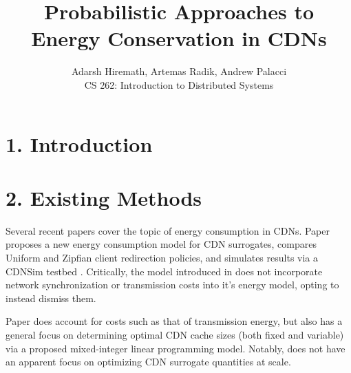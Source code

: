 \documentclass[
	a4paper, %
	10pt, %
	unnumberedsections, %
	twoside, %
]{LTJournalArticle}
\title{Probabilistic Approaches to 
\\ Energy Conservation in CDNs} %
\author{%
	Adarsh Hiremath, Artemas Radik, Andrew Palacci \\
	CS 262: Introduction to Distributed Systems \\
}
\begin{document}
\maketitle %


\section{1. Introduction}

\section{2. Existing Methods}

Several recent papers cover the topic of energy consumption in CDNs. Paper \cite{ulIslam2012} proposes a new energy consumption model for CDN surrogates, compares Uniform and Zipfian client redirection policies, and simulates results via a CDNSim testbed \cite{cdnsim}. Critically, the model introduced in \cite{ulIslam2012} does not incorporate network synchronization or transmission costs into it's energy model, opting to instead dismiss them. 

Paper \cite{osmanthesis} does account for costs such as that of transmission energy, but also has a general focus on determining optimal CDN cache sizes (both fixed and variable) via a proposed mixed-integer linear programming model. Notably, \cite{osmanthesis} does not have an apparent focus on optimizing CDN surrogate quantities at scale.
\end{document}
